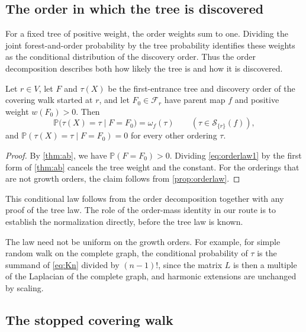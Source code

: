 \documentclass[onefignum,onetabnum,nohypdvips]{siamart250211}
\numberwithin{theorem}{section}
\numberwithin{equation}{section}
\newcommand{\Orders}{\mathcal{S}}
\newcommand{\Fset}{\mathcal{F}}
\newcommand{\pr}{\mathbb{P}}
\begin{document}
\subsection{The order in which the tree is discovered}

For a fixed tree of positive weight, the order weights sum to one.
Dividing the joint forest-and-order probability by the tree
probability identifies these weights as the conditional distribution
of the discovery order. Thus the order decomposition describes both
how likely the tree is and how it is discovered.

\begin{theorem}\label{thm:orderlaw}
Let $r\in V$, let $F$ and $\tau(X)$ be the first-entrance tree and
discovery order of the covering walk started at $r$, and let
$F_0\in\Fset_r$ have parent map $f$ and positive weight $w(F_0)>0$. Then
\[
\pr\big(\tau(X)=\tau\mid F=F_0\big)=\omega_f(\tau)
\qquad(\tau\in\Orders_{\{r\}}(f)),
\]
and $\pr(\tau(X)=\tau\mid F=F_0)=0$ for every other ordering $\tau$.
\end{theorem}

\begin{proof}
By \cref{thm:ab}, we have $\pr(F=F_0)>0$. Dividing \eqref{eq:orderlaw1}
by the first form of \cref{thm:ab} cancels the tree weight and the
constant. For the orderings that are not growth orders, the claim
follows from \cref{prop:orderlaw}.
\end{proof}

This conditional law follows from the order decomposition together
with any proof of the tree law. The role of the order-mass identity
in our route is to establish the normalization directly, before the
tree law is known.

\begin{example}\label{rem:nonuniform}
The law need not be uniform on the growth orders. For example, for
simple random walk on the complete graph, the conditional probability
of $\tau$ is the summand of \eqref{eq:Kn} divided by $(n-1)!$, since the
matrix $L$ is then a multiple of the Laplacian of the complete graph,
and harmonic extensions are unchanged by scaling.
\end{example}

\subsection{The stopped covering walk}
\end{document}
